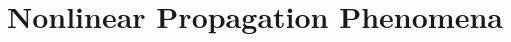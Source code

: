 \chapter[Nonlinear Propagation Phenomena]
  {Nonlinear Propagation Phenomena}
  \label{chp:nonlinear}

  

  

  

  

  